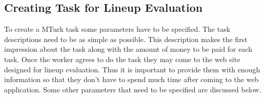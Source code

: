 \documentclass[11pt]{article}
\begin{document}


\subsection{Creating Task for Lineup Evaluation} To create a MTurk task some parameters have to be specified. The task descriptions need to be as simple as possible. This description makes the first impression about the task along with the amount of money to be paid for each task. Once the worker agrees to do the task they may come to the web site designed for lineup evaluation. Thus it is important to provide them with enough information so that they don't have to spend much time after coming to the web application. Some other parameters that need to be specified are discussed below.
\end{document}
